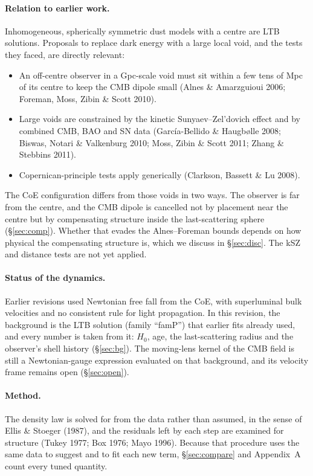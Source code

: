\documentclass[11pt]{article}
\begin{document}
\paragraph{Relation to earlier work.} Inhomogeneous, spherically symmetric dust models with a centre are LTB solutions. Proposals to replace dark energy with a large local void, and the tests they faced, are directly relevant:
\begin{itemize}
\item An off-centre observer in a Gpc-scale void must sit within a few tens of Mpc of its centre to keep the CMB dipole small (Alnes \& Amarzguioui 2006; Foreman, Moss, Zibin \& Scott 2010).
\item Large voids are constrained by the kinetic Sunyaev--Zel'dovich effect and by combined CMB, BAO and SN data (Garc\'ia-Bellido \& Haugb{\o}lle 2008; Biswas, Notari \& Valkenburg 2010; Moss, Zibin \& Scott 2011; Zhang \& Stebbins 2011).
\item Copernican-principle tests apply generically (Clarkson, Bassett \& Lu 2008).
\end{itemize}
The CoE configuration differs from those voids in two ways. The observer is far from the centre, and the CMB dipole is cancelled not by placement near the centre but by compensating structure inside the last-scattering sphere (\S\ref{sec:comp}). Whether that evades the Alnes--Foreman bounds depends on how physical the compensating structure is, which we discuss in \S\ref{sec:disc}. The kSZ and distance tests are not yet applied.

\paragraph{Status of the dynamics.} Earlier revisions used Newtonian free fall from the CoE, with superluminal bulk velocities and no consistent rule for light propagation. In this revision, the background is the LTB solution (family ``famP'') that earlier fits already used, and every number is taken from it: $H_0$, age, the last-scattering radius and the observer's shell history (\S\ref{sec:bg}). The moving-lens kernel of the CMB field is still a Newtonian-gauge expression evaluated on that background, and its velocity frame remains open (\S\ref{sec:open}).

\paragraph{Method.} The density law is solved for from the data rather than assumed, in the sense of Ellis \& Stoeger (1987), and the residuals left by each step are examined for structure (Tukey 1977; Box 1976; Mayo 1996). Because that procedure uses the same data to suggest and to fit each new term, \S\ref{sec:compare} and Appendix~A count every tuned quantity.
\end{document}
